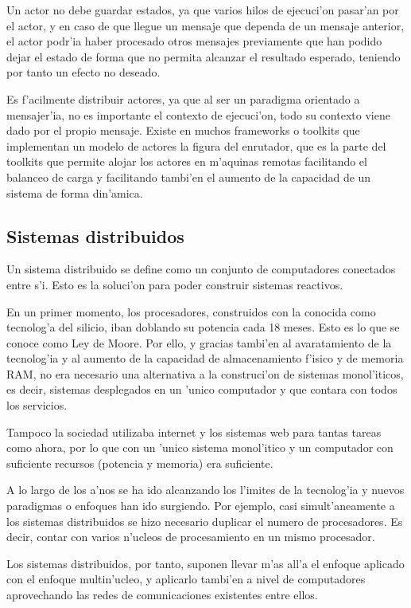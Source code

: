 \documentclass[12pt]{article}
\begin{document}
Un actor no debe guardar estados, ya que  varios hilos de ejecuci'on pasar'an por el actor,
y en caso de que llegue un mensaje que dependa de un mensaje anterior, el actor podr'ia haber procesado
 otros mensajes previamente que han podido dejar el estado de forma que no permita alcanzar el resultado
 esperado, teniendo por tanto un efecto no deseado.

Es f'acilmente distribuir actores, ya que al ser un paradigma orientado a mensajer'ia, no es
importante el contexto de ejecuci'on, todo su contexto viene dado por el propio mensaje. Existe en
muchos frameworks o toolkits que implementan un modelo de actores la figura del enrutador, que es
la parte del toolkits que permite alojar los actores en m'aquinas remotas facilitando el balanceo de
carga y facilitando tambi'en el aumento de la capacidad de un sistema de forma din'amica.

\subsection{Sistemas distribuidos}
\label{sub:sistemas distribuidos}
Un sistema distribuido se define como un conjunto de computadores conectados entre s'i. Esto
es la soluci'on para poder construir sistemas reactivos.

En un primer momento, los procesadores, construidos con la conocida como tecnolog'a del
silicio, iban doblando su potencia cada 18 meses. Esto es lo que se conoce como Ley de Moore.
Por ello, y gracias tambi'en al avaratamiento de la tecnolog'ia y al aumento de la capacidad de
almacenamiento f'isico y de memoria RAM, no era necesario una alternativa a la construci'on de sistemas
monol'iticos, es decir, sistemas desplegados en un 'unico computador y que contara con
todos los servicios.

Tampoco la sociedad utilizaba internet y los sistemas web para tantas tareas como ahora, por lo
que con un 'unico sistema monol'itico y un computador con suficiente recursos (potencia y memoria)
era suficiente.

A lo largo de los a'nos se ha ido alcanzando los l'imites de la tecnolog'ia y nuevos paradigmas o
enfoques han ido surgiendo. Por ejemplo, casi simult'aneamente a los sistemas distribuidos se
hizo necesario duplicar el numero de procesadores. Es decir, contar con varios n'ucleos de
procesamiento en un mismo procesador.

Los sistemas distribuidos, por tanto, suponen llevar m'as all'a el enfoque aplicado con el enfoque
multin'ucleo, y aplicarlo tambi'en a nivel de computadores aprovechando las redes de comunicaciones
existentes entre ellos.
\end{document}
